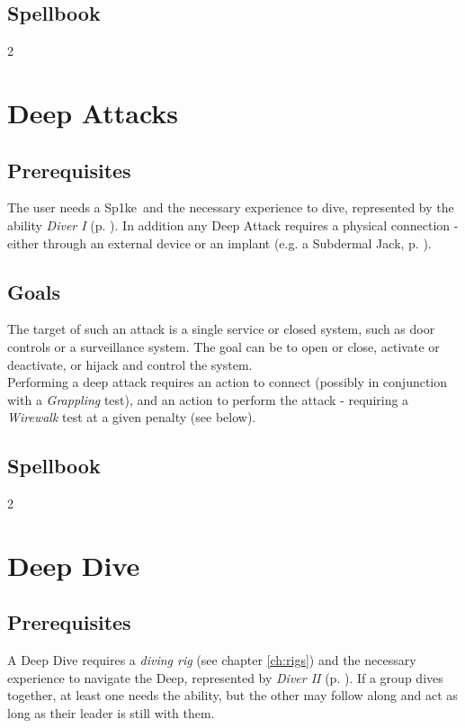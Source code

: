 \documentclass[12pt,a4paper,openany,usenames,dvipsnames]{book}
\def\modifiedlincname{Sp1ke}
\def\hackingskill{Wirewalk}
\begin{document}
	\section{Spellbook}
	\label{sec:arspellbook}
	\vspace{5mm}
	\begin{multicols}{2}
	\end{multicols}

	\chapter{Deep Attacks}
	\section{Prerequisites}
	The user needs a \modifiedlincname\ and the necessary experience to dive, represented by the ability \emph{Diver I} (p. \pageref{ability:diveri}).
	In addition any Deep Attack requires a physical connection
		- either through an external device
		or an implant (e.g. a Subdermal Jack, p. \pageref{implant:subdermaljack}).
	\section{Goals}
	The target of such an attack is a single service or closed system, such as door controls or a surveillance system.
	The goal can be to open or close, activate or deactivate, or hijack and control the system.
	\\%
    Performing a deep attack requires an action to connect (possibly in conjunction with a \emph{Grappling} test),
    and an action to perform the attack - requiring a \emph{\hackingskill} test at a given penalty (see below).
	\section{Spellbook}
	\label{sec:deepspellbook}
    \vspace{5mm}
    \begin{multicols}{2}
    \end{multicols}

	\chapter{Deep Dive}
	\section{Prerequisites}
	A Deep Dive requires a \emph{diving rig} (see chapter \ref{ch:rigs}) and the necessary experience to navigate the Deep, represented by \emph{Diver II} (p. \pageref{ability:diverii}).
	If a group dives together, at least one needs the ability, but the other may follow along and act as long as their leader is still with them.
\end{document}
